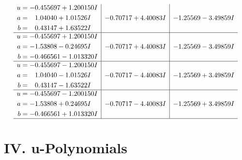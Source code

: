 \documentclass[1p]{elsarticle_modified}
\theoremstyle{definition}
\begin{document}
$$\begin{array}{c|c|c}
\begin{aligned}
u &= -0.455697 + 1.200150 I \\
a &= \phantom{-}1.04040 + 1.01526 I \\
b &= \phantom{-}0.43147 + 1.63522 I\end{aligned}
 & -0.70717 + 4.40083 I & -1.25569 - 3.49859 I \\ \hline\begin{aligned}
u &= -0.455697 + 1.200150 I \\
a &= -1.53808 - 0.24695 I \\
b &= -0.466561 - 1.013320 I\end{aligned}
 & -0.70717 + 4.40083 I & -1.25569 - 3.49859 I \\ \hline\begin{aligned}
u &= -0.455697 - 1.200150 I \\
a &= \phantom{-}1.04040 - 1.01526 I \\
b &= \phantom{-}0.43147 - 1.63522 I\end{aligned}
 & -0.70717 - 4.40083 I & -1.25569 + 3.49859 I \\ \hline\begin{aligned}
u &= -0.455697 - 1.200150 I \\
a &= -1.53808 + 0.24695 I \\
b &= -0.466561 + 1.013320 I\end{aligned}
 & -0.70717 - 4.40083 I & -1.25569 + 3.49859 I\\
 \hline 
 \end{array}$$\newpage
\newpage\renewcommand{\arraystretch}{1}
\centering \section*{ IV. u-Polynomials}
\end{document}
